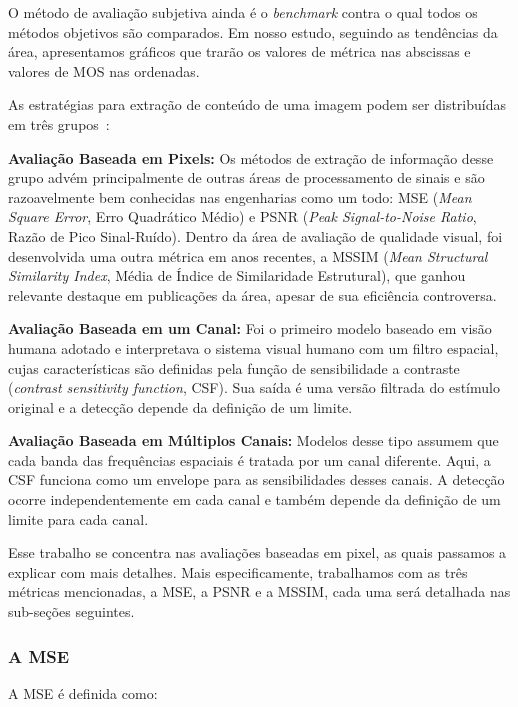 O método de avaliação subjetiva ainda é o \emph{benchmark} contra o qual todos os métodos objetivos são comparados. Em nosso estudo, seguindo as tendências da área, apresentamos gráficos que trarão os valores de métrica nas abscissas e valores de MOS nas ordenadas.

As estratégias para extração de conteúdo de uma imagem podem ser distribuídas em três grupos~\cite{Winkler-2005-Wiley}:

\begin{description}
	\item{\textbf{Avaliação Baseada em Pixels:}}
		Os métodos de extração de informação desse grupo advém principalmente de outras áreas de processamento de sinais e são razoavelmente bem conhecidas nas engenharias como um todo: MSE (\emph{Mean Square Error}, Erro Quadrático Médio) e PSNR (\emph{Peak Signal-to-Noise Ratio}, Razão de Pico Sinal-Ruído). Dentro da área de avaliação de qualidade visual, foi desenvolvida uma outra métrica em anos recentes, a MSSIM (\emph{Mean Structural Similarity Index}, Média de Índice de Similaridade Estrutural), que ganhou relevante destaque em publicações da área, apesar de sua eficiência controversa.
	\item{\textbf{Avaliação Baseada em um Canal:}}
		Foi o primeiro modelo baseado em visão humana adotado e interpretava o sistema visual humano com um filtro espacial, cujas características são definidas pela função de sensibilidade a contraste (\emph{contrast sensitivity function}, CSF). Sua saída é uma versão filtrada do estímulo original e a detecção depende da definição de um limite.
	\item{\textbf{Avaliação Baseada em Múltiplos Canais:}}
		Modelos desse tipo assumem que cada banda das frequências espaciais é tratada por um canal diferente. Aqui, a CSF funciona como um envelope para as sensibilidades desses canais. A detecção ocorre independentemente em cada canal e também depende da definição de um limite para cada canal.
\end{description}

Esse trabalho se concentra nas avaliações baseadas em pixel, as quais passamos a explicar com mais detalhes. Mais especificamente, trabalhamos com as três métricas mencionadas, a MSE, a PSNR e a MSSIM, cada uma será detalhada nas sub-seções seguintes.

\subsubsection{A MSE}
A MSE é definida como:

